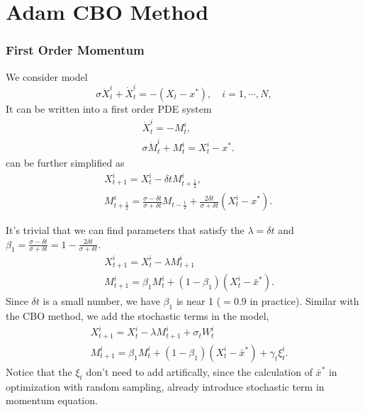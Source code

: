 \documentclass{beamer}
\begin{document}
\section{Adam CBO Method}
\begin{frame}
	\frametitle{First Order Momentum}
	We consider model
	\begin{equation}
    \sigma \ddot X^i_t + \dot X^i_t = -(X_t- x^*) , \quad i=1,\cdots,N, \label{eqn:2ndsystem}
\end{equation}
It can be written into a first order PDE system
\begin{align*}
    &\dot X_t^i = -M_t^i, \\
    &\sigma \dot M_t^i + M_t^i = X_t^i - x^*.
\end{align*}
can be further simplified as
\begin{align}
&X^i_{t+1} = X_t^i -\delta t M^i_{t+\frac{1}{2}},\\
&M^i_{t+\frac{1}{2}} = \frac{\sigma - \delta t}{\sigma+ \delta t}M_{t-\frac{1}{2}} + \frac{2\delta t}{\sigma  + \delta t } (X_t^i - x^*).
\end{align}
\end{frame}
\begin{frame}
It's trivial that we can find parameters that satisfy the $\lambda = \delta t $ and $\beta_1 =\frac{\sigma - \delta t}{\sigma+ \delta t} =1 - \frac{2\delta t }{\sigma  + \delta t }  $.
	\begin{equation}
		\begin{aligned}
&X^i_{t+1} = X_t^i - \lambda M^i_{t+1}  \\
\ &M^i_{t+1} = \beta_1 M^i_{t} + (1-\beta_1) (X_t^i - \bar{x}^*).
		\end{aligned}
	\end{equation}
	Since $\delta t$ is a small number, we have $\beta_1$ is near 1 ($=0.9$ in practice).
	Similar with the CBO method, we add the stochastic terms in the model,
	\begin{equation}
		\begin{aligned}
&X^i_{t+1} = X_t^i - \lambda M^i_{t+1} + \sigma_t  W^i_t \\
\ &M^i_{t+1} = \beta_1 M^i_{t} + (1-\beta_1) (X_t^i - \bar{x}^*)+\gamma_t  \xi^i_t.
	\end{aligned}
	\end{equation}
Notice that the $\xi_t$ don't need to add artifically, since the calculation of $\bar{x}^*$ in optimization with random sampling, already introduce stochastic term in momentum equation.
	\end{frame}
\end{document}
